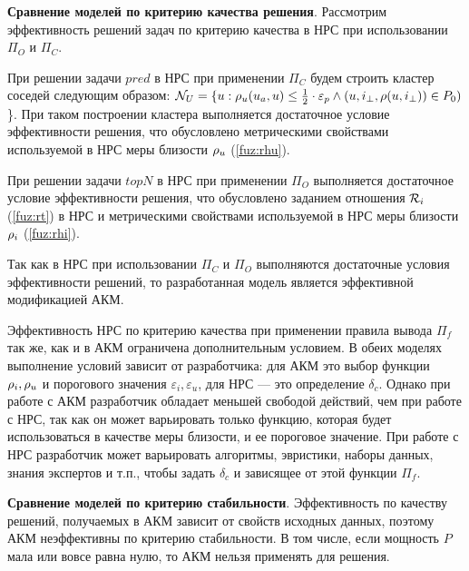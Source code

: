 {\bf Сравнение моделей по критерию качества решения}.
Рассмотрим эффективность решений задач по критерию качества
в НРС при использовании $\Pi_O$ и $\Pi_C$.

При решении задачи $pred$ в НРС при применении $\Pi_C$
будем строить кластер соседей следующим образом:
$\mathcal{N}_U = \{ u : \mathcal{\rho}_u(u_a, u) \le \frac{1}{2} \cdot \varepsilon_p \wedge
(u, i_{\bot}, \rho(u, i_{\bot})) \in P_0)$ \}.
При таком построении кластера выполняется
достаточное условие эффективности решения,
что обусловлено
метрическими свойствами используемой в НРС
меры близости $\mathcal{\rho}_u$ (\ref{fuz:rhu}).

При решении задачи $topN$ в НРС при применении $\Pi_O$
выполняется достаточное условие эффективности решения,
что обусловлено заданием отношения $\mathcal{R}_i$ (\ref{fuz:rt})
в НРС и метрическими свойствами используемой в
НРС меры близости $\mathcal{\rho}_i$ (\ref{fuz:rhi}).

Так как в НРС при использовании $\Pi_C$ и $\Pi_O$
выполняются достаточные условия эффективности решений, то
разработанная модель является эффективной модификацией АКМ.

Эффективность НРС по критерию качества при применении правила
вывода $\Pi_f$ так же, как и в АКМ ограничена
дополнительным условием.
В обеих моделях выполнение условий
зависит от разработчика: для АКМ это выбор функции $\mathcal{\rho}_i, \mathcal{\rho}_u$ и порогового
значения $\varepsilon_i, \varepsilon_u$, для НРС --- это
определение $\delta_c$.
Однако при работе с АКМ
разработчик обладает меньшей свободой действий, чем при работе с
НРС, так как он может варьировать только функцию, которая будет
использоваться в качестве меры близости, и ее пороговое значение.
При работе с НРС разработчик может варьировать
алгоритмы, эвристики, наборы данных, знания
экспертов и т.п., чтобы задать $\delta_c$ и зависящее от этой функции $\Pi_f$.

{\bf Сравнение моделей по критерию стабильности}.
Эффективность по качеству решений, получаемых в АКМ зависит от свойств исходных
данных, поэтому АКМ неэффективны по критерию стабильности. В том числе, если
мощность $P$ мала или вовсе равна нулю, то АКМ нельзя применять для
решения.

